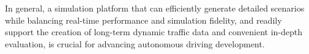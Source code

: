 In general, a simulation platform that can efficiently generate detailed scenarios while balancing real-time performance and simulation fidelity, and readily support the creation of long-term dynamic traffic data and convenient in-depth evaluation, is crucial for advancing autonomous driving development.